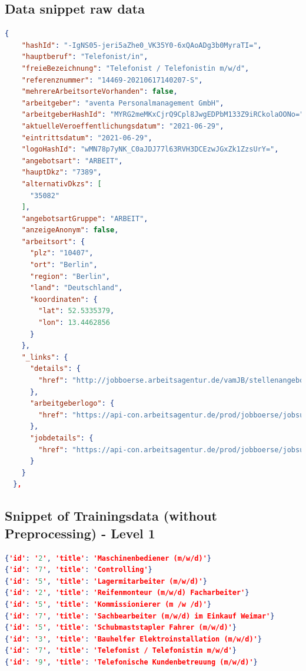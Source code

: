 \documentclass[12pt, a4paper, titlepage]{article}
\begin{document}
\subsection*{Data snippet raw data}
\begin{lstlisting}[language=json]
  {
    "hashId": "-IgNS05-jeri5aZhe0_VK35Y0-6xQAoADg3b0MyraTI=",
    "hauptberuf": "Telefonist/in",
    "freieBezeichnung": "Telefonist / Telefonistin m/w/d",
    "referenznummer": "14469-20210617140207-S",
    "mehrereArbeitsorteVorhanden": false,
    "arbeitgeber": "aventa Personalmanagement GmbH",
    "arbeitgeberHashId": "MYRG2meMKxCjrQ9Cpl8JwgEDPbM133Z9iRCkolaOONo=",
    "aktuelleVeroeffentlichungsdatum": "2021-06-29",
    "eintrittsdatum": "2021-06-29",
    "logoHashId": "wMN78p7yNK_C0aJDJ77l63RVH3DCEzwJGxZk1ZzsUrY=",
    "angebotsart": "ARBEIT",
    "hauptDkz": "7389",
    "alternativDkzs": [
      "35082"
    ],
    "angebotsartGruppe": "ARBEIT",
    "anzeigeAnonym": false,
    "arbeitsort": {
      "plz": "10407",
      "ort": "Berlin",
      "region": "Berlin",
      "land": "Deutschland",
      "koordinaten": {
        "lat": 52.5335379,
        "lon": 13.4462856
      }
    },
    "_links": {
      "details": {
        "href": "http://jobboerse.arbeitsagentur.de/vamJB/stellenangebotAnzeigen.html?bencs=xZ8NQKDByg2g6avJgLLIrGwqlXZQi1GKNAI%2BzAoCWJ5RD6egZDnwqMFj%2B4AnUX6XN5nyEJ7NKSdBBr1EvlmnVw%3D%3D"
      },
      "arbeitgeberlogo": {
        "href": "https://api-con.arbeitsagentur.de/prod/jobboerse/jobsuche-service/ed/v1/arbeitgeberlogo/wMN78p7yNK_C0aJDJ77l63RVH3DCEzwJGxZk1ZzsUrY="
      },
      "jobdetails": {
        "href": "https://api-con.arbeitsagentur.de/prod/jobboerse/jobsuche-service/pc/v1/jobdetails/-IgNS05-jeri5aZhe0_VK35Y0-6xQAoADg3b0MyraTI="
      }
    }
  },
\end{lstlisting}


\subsection*{Snippet of Trainingsdata (without Preprocessing) - Level 1}
\begin{lstlisting}[language=json, firstnumber=1]
{'id': '2', 'title': 'Maschinenbediener (m/w/d)'}
{'id': '7', 'title': 'Controlling'}
{'id': '5', 'title': 'Lagermitarbeiter (m/w/d)'}
{'id': '2', 'title': 'Reifenmonteur (m/w/d) Facharbeiter'}
{'id': '5', 'title': 'Kommissionierer (m /w /d)'}
{'id': '7', 'title': 'Sachbearbeiter (m/w/d) im Einkauf Weimar'}
{'id': '5', 'title': 'Schubmaststapler Fahrer (m/w/d)'}
{'id': '3', 'title': 'Bauhelfer Elektroinstallation (m/w/d)'}
{'id': '7', 'title': 'Telefonist / Telefonistin m/w/d'}
{'id': '9', 'title': 'Telefonische Kundenbetreuung (m/w/d)'}
\end{lstlisting}
\end{document}
